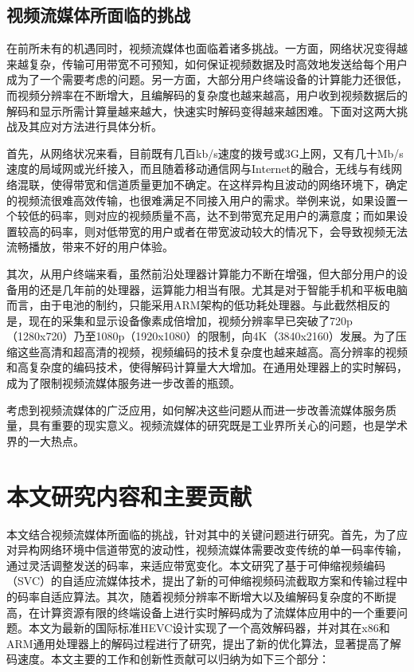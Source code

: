 \subsection{视频流媒体所面临的挑战}

在前所未有的机遇同时，视频流媒体也面临着诸多挑战。一方面，网络状况变得越来越复杂，传输可用带宽不可预知，如何保证视频数据及时高效地发送给每个用户成为了一个需要考虑的问题。另一方面，大部分用户终端设备的计算能力还很低，而视频分辨率在不断增大，且编解码的复杂度也越来越高，用户收到视频数据后的解码和显示所需计算量越来越大，快速实时解码变得越来越困难。下面对这两大挑战及其应对方法进行具体分析。

首先，从网络状况来看，目前既有几百kb/s速度的拨号或3G上网，又有几十Mb/s速度的局域网或光纤接入，而且随着移动通信网与Internet的融合，无线与有线网络混联，使得带宽和信道质量更加不确定。在这样异构且波动的网络环境下，确定的视频流很难高效传输，也很难满足不同接入用户的需求。举例来说，如果设置一个较低的码率，则对应的视频质量不高，达不到带宽充足用户的满意度；而如果设置较高的码率，则对低带宽的用户或者在带宽波动较大的情况下，会导致视频无法流畅播放，带来不好的用户体验。

其次，从用户终端来看，虽然前沿处理器计算能力不断在增强，但大部分用户的设备用的还是几年前的处理器，运算能力相当有限。尤其是对于智能手机和平板电脑而言，由于电池的制约，只能采用ARM架构的低功耗处理器。与此截然相反的是，现在的采集和显示设备像素成倍增加，视频分辨率早已突破了720p（1280x720）乃至1080p（1920x1080）的限制，向4K（3840x2160）发展。为了压缩这些高清和超高清的视频，视频编码的技术复杂度也越来越高。高分辨率的视频和高复杂度的编码技术，使得解码计算量大大增加。在通用处理器上的实时解码，成为了限制视频流媒体服务进一步改善的瓶颈。

考虑到视频流媒体的广泛应用，如何解决这些问题从而进一步改善流媒体服务质量，具有重要的现实意义。视频流媒体的研究既是工业界所关心的问题，也是学术界的一大热点。

\section{本文研究内容和主要贡献}

本文结合视频流媒体所面临的挑战，针对其中的关键问题进行研究。首先，为了应对异构网络环境中信道带宽的波动性，视频流媒体需要改变传统的单一码率传输，通过灵活调整发送的码率，来适应带宽变化。本文研究了基于可伸缩视频编码（SVC）的自适应流媒体技术，提出了新的可伸缩视频码流截取方案和传输过程中的码率自适应算法。其次，随着视频分辨率不断增大以及编解码复杂度的不断提高，在计算资源有限的终端设备上进行实时解码成为了流媒体应用中的一个重要问题。本文为最新的国际标准HEVC设计实现了一个高效解码器，并对其在x86和ARM通用处理器上的解码过程进行了研究，提出了新的优化算法，显著提高了解码速度。本文主要的工作和创新性贡献可以归纳为如下三个部分：

